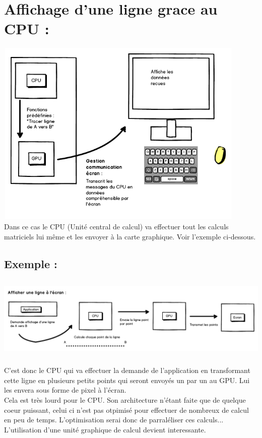\section{Affichage d'une ligne grace au CPU :}
\includegraphics[width=12cm,height=9cm]{img/cpuRaster.png} \\
Dans ce cas le CPU (Unité central de calcul) va effectuer tout les calculs matriciels lui même et les envoyer à la carte graphique. Voir l'exemple ci-dessous.
\subsection{Exemple :}
\begin{center}
\includegraphics[width=15cm,height=4cm]{img/cpuRasterExemple.png}
\end{center}
C'est donc le CPU qui va effectuer la demande de l'application en transformant cette ligne en plusieurs petits points qui seront envoyés un par un au GPU. Lui les envera sous forme de pixel à l'écran.\\
Cela est très lourd pour le CPU. Son architecture n'étant faite que de quelque coeur puissant, celui ci n'est pas otpimisé pour effectuer de nombreux de calcul en peu de temps. L'optimisation serai donc de parraléliser ces calculs... L'utilisation d'une unité graphique de calcul devient interessante.

